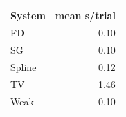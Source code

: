 \begin{tabular}{lr}\toprule
System & mean s/trial \\\midrule
FD & 0.10 \\
SG & 0.10 \\
Spline & 0.12 \\
TV & 1.46 \\
Weak & 0.10 \\
\bottomrule\end{tabular}
